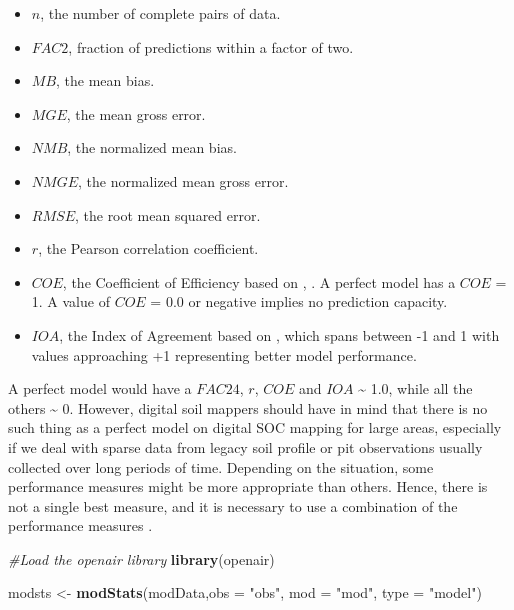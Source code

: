 \documentclass[10pt,b5paper,]{book}
\newenvironment{Shaded}{\begin{snugshade}}{\end{snugshade}}
\newcommand{\CommentTok}[1]{\textcolor[rgb]{0.56,0.35,0.01}{\textit{#1}}}
\newcommand{\DataTypeTok}[1]{\textcolor[rgb]{0.13,0.29,0.53}{#1}}
\newcommand{\KeywordTok}[1]{\textcolor[rgb]{0.13,0.29,0.53}{\textbf{#1}}}
\newcommand{\NormalTok}[1]{#1}
\newcommand{\StringTok}[1]{\textcolor[rgb]{0.31,0.60,0.02}{#1}}
\providecommand{\tightlist}{%
  \setlength{\itemsep}{0pt}\setlength{\parskip}{0pt}}
\theoremstyle{definition}
\theoremstyle{definition}
\theoremstyle{definition}
\theoremstyle{remark}
\begin{document}
\begin{itemize}
\tightlist
\item
  \(n\), the number of complete pairs of data.
\item
  \(FAC2\), fraction of predictions within a factor of two.
\item
  \(MB\), the mean bias.
\item
  \(MGE\), the mean gross error.
\item
  \(NMB\), the normalized mean bias.
\item
  \(NMGE\), the normalized mean gross error.
\item
  \(RMSE\), the root mean squared error.
\item
  \(r\), the Pearson correlation coefficient.
\item
  \(COE\), the Coefficient of Efficiency based on
  \citet{legates1999evaluating}, \citet{legates2013refined}. A perfect
  model has a \(COE\) = 1. A value of \(COE\) = 0.0 or negative implies
  no prediction capacity.
\item
  \(IOA\), the Index of Agreement based on \citet{willmott2012refined},
  which spans between -1 and 1 with values approaching +1 representing
  better model performance.
\end{itemize}

A perfect model would have a \(FAC24\), \(r\), \(COE\) and \(IOA\)
\textasciitilde{} 1.0, while all the others \textasciitilde{} 0.
However, digital soil mappers should have in mind that there is no such
thing as a perfect model on digital SOC mapping for large areas,
especially if we deal with sparse data from legacy soil profile or pit
observations usually collected over long periods of time. Depending on
the situation, some performance measures might be more appropriate than
others. Hence, there is not a single best measure, and it is necessary
to use a combination of the performance measures \citep{chang2004air}.

\begin{Shaded}
\begin{Highlighting}[]
\CommentTok{#Load the openair library}
\KeywordTok{library}\NormalTok{(openair)}

\NormalTok{modsts <-}\StringTok{ }\KeywordTok{modStats}\NormalTok{(modData,}\DataTypeTok{obs =} \StringTok{"obs"}\NormalTok{, }\DataTypeTok{mod =} \StringTok{"mod"}\NormalTok{, }\DataTypeTok{type =} \StringTok{"model"}\NormalTok{)}
\end{Highlighting}
\end{Shaded}
\end{document}
